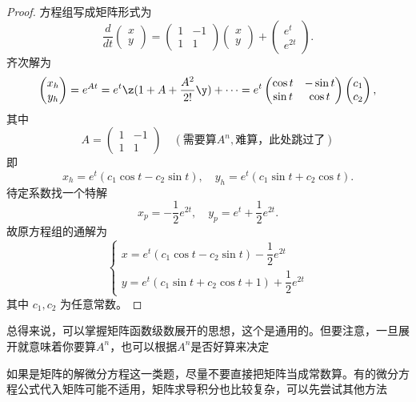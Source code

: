 \begin{proof}
方程组写成矩阵形式为
\[
\frac{d}{dt}\begin{pmatrix}x\\ y\end{pmatrix} = \begin{pmatrix}1 & -1\\ 1 & 1\end{pmatrix}\begin{pmatrix}x\\ y\end{pmatrix} + \begin{pmatrix}e^{t}\\ e^{2t}\end{pmatrix}.
\]
齐次解为
\[
\begin{pmatrix}x_h\\ y_h\end{pmatrix} = e^{At} = e^t \z(1 + A + \frac{A^2}{2!}\y)  + \cdots =
e^{t}\begin{pmatrix}\cos t & -\sin t\\ \sin t & \cos t\end{pmatrix}\begin{pmatrix}c_1\\ c_2\end{pmatrix},
\]
其中
\[
A = \begin{pmatrix}1 & -1\\ 1 & 1\end{pmatrix}  \quad(\text{需要算}A^n,\text{难算，此处跳过了})
\]
即
\[
x_h = e^{t}(c_1\cos t - c_2\sin t),\quad y_h = e^{t}(c_1\sin t + c_2\cos t).
\]
待定系数找一个特解
\[
x_p = -\frac{1}{2}e^{2t},\quad y_p = e^{t} + \frac{1}{2}e^{2t}.
\]
故原方程组的通解为
\[
\boxed{\begin{cases}
x = e^{t}(c_1\cos t - c_2\sin t) - \dfrac{1}{2}e^{2t}\\[6pt]
y = e^{t}(c_1\sin t + c_2\cos t + 1) + \dfrac{1}{2}e^{2t}
\end{cases}}
\]
其中 \(c_1, c_2\) 为任意常数。
\end{proof}

\begin{note}
总得来说，可以掌握矩阵函数级数展开的思想，这个是通用的。但要注意，一旦展开就意味着你要算$ A^n $，也可以根据$A^n$是否好算来决定

如果是矩阵的解微分方程这一类题，尽量不要直接把矩阵当成常数算。有的微分方程公式代入矩阵可能不适用，矩阵求导积分也比较复杂，可以先尝试其他方法
\end{note}


